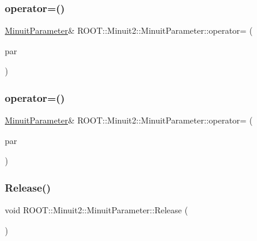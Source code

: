 \subsubsection{\texorpdfstring{operator=()}{operator=()}\hspace{0.1cm}{\footnotesize\ttfamily [2/3]}}
{\footnotesize\ttfamily \mbox{\hyperlink{classROOT_1_1Minuit2_1_1MinuitParameter}{Minuit\+Parameter}}\& R\+O\+O\+T\+::\+Minuit2\+::\+Minuit\+Parameter\+::operator= (\begin{DoxyParamCaption}\item[{const \mbox{\hyperlink{classROOT_1_1Minuit2_1_1MinuitParameter}{Minuit\+Parameter}} \&}]{par }\end{DoxyParamCaption})\hspace{0.3cm}{\ttfamily [inline]}}

\mbox{\label{classROOT_1_1Minuit2_1_1MinuitParameter_ae26eba9113194d198e988d7c87057398}} 
\subsubsection{\texorpdfstring{operator=()}{operator=()}\hspace{0.1cm}{\footnotesize\ttfamily [3/3]}}
{\footnotesize\ttfamily \mbox{\hyperlink{classROOT_1_1Minuit2_1_1MinuitParameter}{Minuit\+Parameter}}\& R\+O\+O\+T\+::\+Minuit2\+::\+Minuit\+Parameter\+::operator= (\begin{DoxyParamCaption}\item[{const \mbox{\hyperlink{classROOT_1_1Minuit2_1_1MinuitParameter}{Minuit\+Parameter}} \&}]{par }\end{DoxyParamCaption})\hspace{0.3cm}{\ttfamily [inline]}}

\mbox{\label{classROOT_1_1Minuit2_1_1MinuitParameter_a9bf4bb232de53b61fc264c62b44d0b27}} 
\subsubsection{\texorpdfstring{Release()}{Release()}\hspace{0.1cm}{\footnotesize\ttfamily [1/3]}}
{\footnotesize\ttfamily void R\+O\+O\+T\+::\+Minuit2\+::\+Minuit\+Parameter\+::\+Release (\begin{DoxyParamCaption}{ }\end{DoxyParamCaption})\hspace{0.3cm}{\ttfamily [inline]}}

